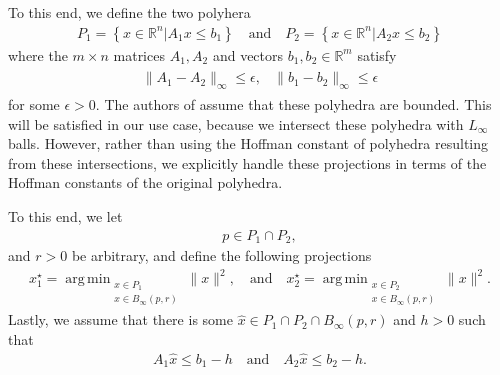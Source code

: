 \documentclass{article}
\theoremstyle{case}
\numberwithin{theorem}{subsection}
\DeclareMathOperator*{\argmin}{arg\,min}
\newcommand{\bpr}{{B_{\infty}\left(p, r\right)}}
\newcommand{\Rm}{\mathbb R^m}
\newcommand{\Rn}{\mathbb R^n}
\begin{document}
To this end, we define the two polyhera
\begin{align}
\label{bap_define_the_polyhedra}
P_1 = \left\{ x \in \Rn | A_1x\le b_1 \right\}
\quad \textrm{and} \quad
P_2 = \left\{ x \in \Rn | A_2x\le b_2 \right\}
\end{align}
where the $m\times n$ matrices $A_1, A_2$ and vectors $b_1, b_2 \in \Rm$ satisfy
\begin{align}
\begin{array}{cc}
\|A_1 - A_2\|_{\infty} \le \epsilon, & \|b_1 - b_2\|_{\infty} \le \epsilon
\label{bap_polyhedra_are_close}
\end{array}
\end{align}
for some $\epsilon > 0$.
The authors of \cite{continuity_of_metric_projections} assume that these polyhedra are bounded.
This will be satisfied in our use case, because we intersect these polyhedra with $L_{\infty}$ balls.
However, rather than using the Hoffman constant of polyhedra resulting from these intersections,
we explicitly handle these projections in terms of the Hoffman constants of the original polyhedra.

% 
% 
% 

To this end, we let 
\begin{align}
p \in P_1\cap P_2,
\label{bap_define_ps}
\end{align} and $r>0$ be arbitrary, 
and define the following projections
\begin{align}
x_1^{\star} = \argmin_{
\substack{x\in P_1 \\ x \in \bpr }
}\|x\|^2, 
\quad \textrm{and} \quad
x_2^{\star} = \argmin_{
\substack{x\in P_2 \\ x \in \bpr }
}\|x\|^2.
\label{bap_define_the_projections}
\end{align}
Lastly, we assume that there is some $\hat x \in P_1 \cap P_2 \cap \bpr$ and $h > 0$ such that 
\begin{align}
\label{bap_feasible_by_h}
A_1 \hat x \le b_1 - h
\quad \textrm{and} \quad
A_2 \hat x \le b_2 - h.
\end{align}
\end{document}
